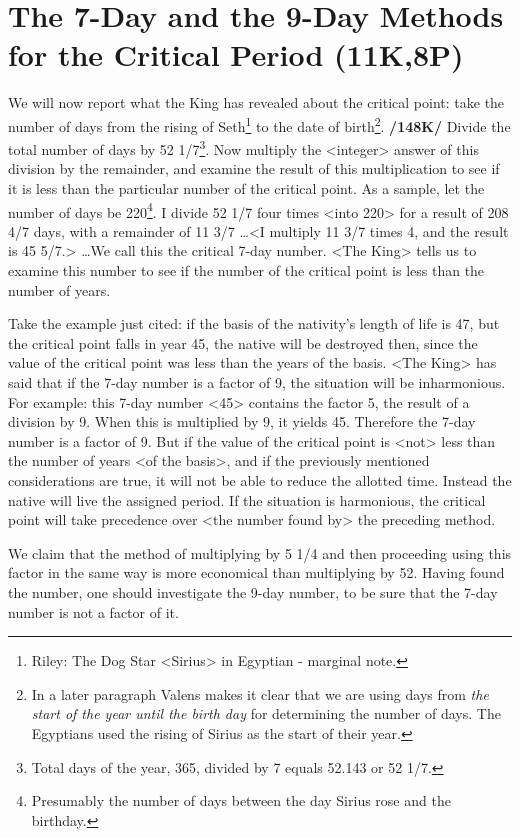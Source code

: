\section{The 7-Day and the 9-Day Methods for the Critical Period (11K,8P)}

We will now report what the King has revealed about the critical point: take the number of days from the rising of Seth\footnote{Riley: The Dog Star <Sirius> in Egyptian - marginal note.} to the date of birth\footnote{In a later paragraph Valens makes it clear that we are using days from \textsl{the start of the year until the birth day} for determining the number of days. The Egyptians used the rising of Sirius as the start of their year.}. \textbf{/148K/} Divide the total number of days by 52 1/7\footnote{Total days of the year, 365, divided by 7 equals  52.143 or 52 1/7.}. Now multiply the <integer> answer of this division by the remainder, and examine the result of this multiplication to see if it is less than the particular number of the critical point. As a sample, let the number of days be 220\footnote{Presumably the number of days between the day Sirius rose and the birthday.}. I divide 52 1/7 four times <into 220> for a result of 208 4/7 days, with a remainder of 11 3/7 \ldots <I multiply 11 3/7 times 4, and the result is 45 5/7.> \ldots We call this the critical 7-day number.
<The King> tells us to examine this number to see if the number of the critical point is less than the number of years. 

Take the example just cited: if the basis of the nativity’s length of life is 47, but the critical point falls in year 45, the native will be destroyed then, since the value of the critical point was less than the years of the basis. <The King> has said that if the 7-day number is a factor of 9, the situation will be inharmonious. For example: this 7-day number <45> contains the factor 5, the result of a division by
9. When this is multiplied by 9, it yields 45. Therefore the 7-day number is a factor of 9. But if the value of the critical point is <not> less than the number of years <of the basis>, and if the previously mentioned considerations are true, it will not be able to reduce the allotted time. Instead the native will live the assigned period. If the situation is harmonious, the critical point will take precedence over <the
number found by> the preceding method.

We claim that the method of multiplying by 5 1/4 and then proceeding using this factor in the same way is more economical than multiplying by 52. Having found the number, one should investigate the 9-day number, to be sure that the 7-day number is not a factor of it.

